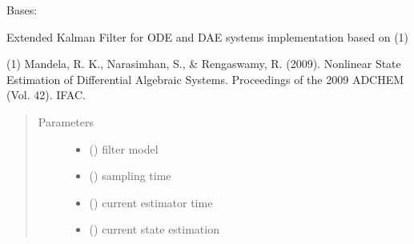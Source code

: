 \documentclass[letterpaper,10pt,english]{sphinxmanual}
\begin{document}
\begin{fulllineitems}
\label{\detokenize{yaocptool.estimation:yaocptool.estimation.extended_kalman_filter.ExtendedKalmanFilter}}
Bases: {\hyperref[\detokenize{yaocptool.estimation:yaocptool.estimation.estimator_abstract.EstimatorAbstract}]{}}

\begin{fulllineitems}
\label{\detokenize{yaocptool.estimation:yaocptool.estimation.extended_kalman_filter.ExtendedKalmanFilter.__init__}}
Extended Kalman Filter for ODE and DAE systems implementation based on (1)

(1) Mandela, R. K., Narasimhan, S., \& Rengaswamy, R. (2009).
Nonlinear State Estimation of Differential Algebraic Systems. Proceedings of the 2009 ADCHEM (Vol. 42). IFAC.
\begin{quote}\begin{description}
\item[{Parameters}] \leavevmode\begin{itemize}
\item {} 
 ({\hyperref[\detokenize{yaocptool.modelling:yaocptool.modelling.system_model.SystemModel}]{}}) \textendash{} filter model

\item {} 
 () \textendash{} sampling time

\item {} 
 () \textendash{} current estimator time

\item {} 
 () \textendash{} current state estimation


\end{itemize}
\end{description}
\end{quote}
\end{fulllineitems}
\end{fulllineitems}
\end{document}
